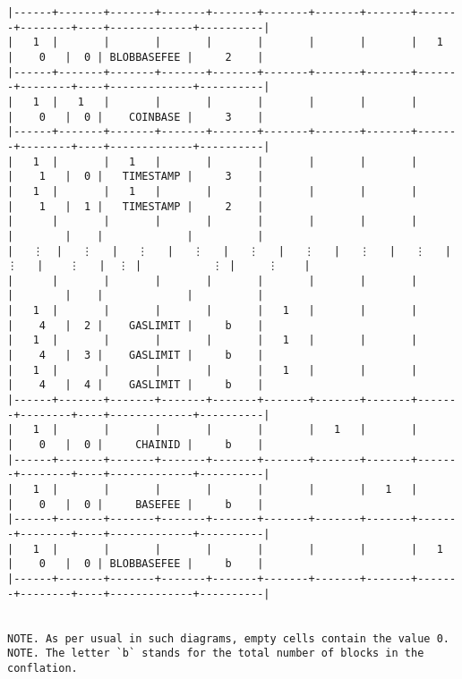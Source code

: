 \documentclass[varwidth=\maxdimen,margin=0.5cm,multi={verbatim}]{standalone}
\begin{document}
\begin{verbatim}
|------+-------+-------+-------+-------+-------+-------+-------+-------+--------+----+-------------+----------|
|   1  |       |       |       |       |       |       |       |   1   |    0   |  0 | BLOBBASEFEE |     2    |
|------+-------+-------+-------+-------+-------+-------+-------+-------+--------+----+-------------+----------|
|   1  |   1   |       |       |       |       |       |       |       |    0   |  0 |    COINBASE |     3    |
|------+-------+-------+-------+-------+-------+-------+-------+-------+--------+----+-------------+----------|
|   1  |       |   1   |       |       |       |       |       |       |    1   |  0 |   TIMESTAMP |     3    |
|   1  |       |   1   |       |       |       |       |       |       |    1   |  1 |   TIMESTAMP |     2    |
|      |       |       |       |       |       |       |       |       |        |    |             |          |
|   ⋮  |   ⋮   |   ⋮   |   ⋮   |   ⋮   |   ⋮   |   ⋮   |   ⋮   |   ⋮   |    ⋮   |  ⋮ |           ⋮ |     ⋮    |
|      |       |       |       |       |       |       |       |       |        |    |             |          |
|   1  |       |       |       |       |   1   |       |       |       |    4   |  2 |    GASLIMIT |     b    |
|   1  |       |       |       |       |   1   |       |       |       |    4   |  3 |    GASLIMIT |     b    |
|   1  |       |       |       |       |   1   |       |       |       |    4   |  4 |    GASLIMIT |     b    |
|------+-------+-------+-------+-------+-------+-------+-------+-------+--------+----+-------------+----------|
|   1  |       |       |       |       |       |   1   |       |       |    0   |  0 |     CHAINID |     b    |
|------+-------+-------+-------+-------+-------+-------+-------+-------+--------+----+-------------+----------|
|   1  |       |       |       |       |       |       |   1   |       |    0   |  0 |     BASEFEE |     b    |
|------+-------+-------+-------+-------+-------+-------+-------+-------+--------+----+-------------+----------|
|   1  |       |       |       |       |       |       |       |   1   |    0   |  0 | BLOBBASEFEE |     b    |
|------+-------+-------+-------+-------+-------+-------+-------+-------+--------+----+-------------+----------|


NOTE. As per usual in such diagrams, empty cells contain the value 0.
NOTE. The letter `b` stands for the total number of blocks in the conflation.

\end{verbatim}
\end{document}
